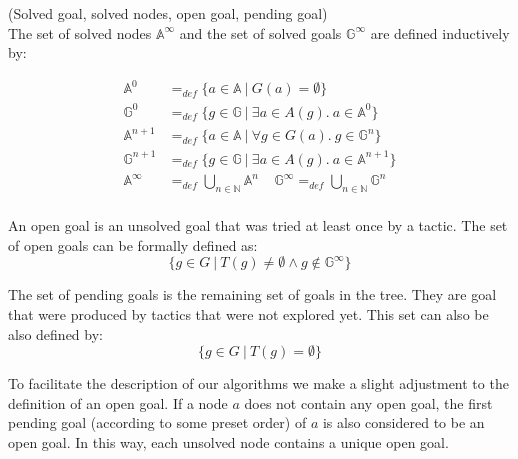\documentclass[runningheads,a4paper,draft]{svjour3}
\newcommand{\todoi}[1]{\todo[inline]{#1}}
\begin{document}
\begin{definition}\label{def:solved}(Solved goal, solved nodes, open goal,
pending goal)\\
The set of solved nodes $\mathbb{A}^\infty$ and
the set of solved goals $\mathbb{G}^\infty$ are defined inductively by:

\begin{align*}
\mathbb{A}^{0} &=_{def}
\lbrace a \in \mathbb{A}\ |\ G(a) = \emptyset \rbrace \\
\mathbb{G}^{0} &=_{def} \lbrace g \in \mathbb{G}\ |\
\exists a \in A(g).\ a \in \mathbb{A}^{0} \rbrace\\
\mathbb{A}^{n+1} &=_{def} \lbrace a \in \mathbb{A}\ |\
\forall g \in G(a).\ g \in \mathbb{G}^{n} \rbrace\\
\mathbb{G}^{n+1} &=_{def} \lbrace g \in \mathbb{G}\ |\
\exists a \in A(g).\ a \in \mathbb{A}^{n+1} \rbrace \\
\mathbb{A}^\infty &=_{def} \bigcup_{n \in \mathbb{N}} \mathbb{A}^n \ \ \ \ \
\mathbb{G}^\infty =_{def} \bigcup_{n \in \mathbb{N}} \mathbb{G}^n\\
\end{align*}

An open goal is an unsolved goal that was tried at least once by a tactic. The
set of open goals can be formally defined as:
\[\lbrace g \in G\ |\  T(g) \neq \emptyset \wedge g \notin \mathbb{G}^\infty
\rbrace\]

The set of pending goals is the remaining set of goals in the tree. They are
goal that were produced by tactics that were not explored yet. This set can
also be also defined by:
\[\lbrace g \in G\ |\  T(g) = \emptyset \rbrace\]

To facilitate the description  of our algorithms we make a slight adjustment
to the definition of an open goal. If a node $a$ does not contain any open
goal, the first pending goal (according
to some preset order) of $a$ is also considered to be an open goal. In this
way, each unsolved node contains a unique open goal.
\end{definition}



\todoi{some text to add here}
\end{document}
